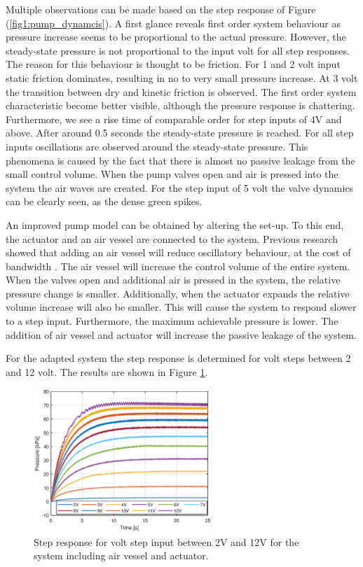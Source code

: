Multiple observations can be made based on the step response of Figure (\ref{fig1:pump_dynamcis}). A first glance reveals first order system behaviour as  pressure increase seems to be proportional to the actual pressure. However, the steady-state pressure is not proportional to the input volt for all step responses. The reason for this behaviour is thought to be friction. For 1 and 2 volt input static friction dominates, resulting in no to very small pressure increase. At 3 volt the transition between dry and kinetic friction is observed. The first order system characteristic become better visible, although the pressure response is chattering. Furthermore, we see a rise time of comparable order for step inputs of 4V and above. After around 0.5 seconds the steady-state pressure is reached. For all step inputs oscillations are observed around the steady-state pressure. This phenomena is caused by the fact that there is almost no passive leakage from the small control volume. When the pump valves open and air is pressed into the system the air waves are created. For the step input of 5 volt the valve dynamics can be clearly seen, as the dense green spikes.

An improved pump model can be obtained by altering the set-up. To this end, the actuator and an air vessel are connected to the system. Previous research showed that adding an air vessel will reduce oscillatory behaviour, at the cost of bandwidth \cite{proper}. The air vessel will increase the control volume of the entire system. When the valves open and additional air is pressed in the system, the relative pressure change is smaller. Additionally, when the actuator expands the relative volume increase will also be smaller. This will cause the system to respond slower to a step input. Furthermore, the maximum achievable pressure is lower. The addition of air vessel and actuator will increase the passive leakage of the system.

For the adapted system the step response is determined for volt steps between 2 and 12 volt. The results are shown in Figure \ref{fig3:pump_dynamics_adapted}.

\begin{figure}[H]
    \centering
    \includegraphics[width = 0.6\textwidth]{Figures/Chapter3/step212V.eps}
    \caption{Step response for volt step input between 2V and 12V for the system including air vessel and actuator.}
    \label{fig3:pump_dynamics_adapted}
\end{figure}


